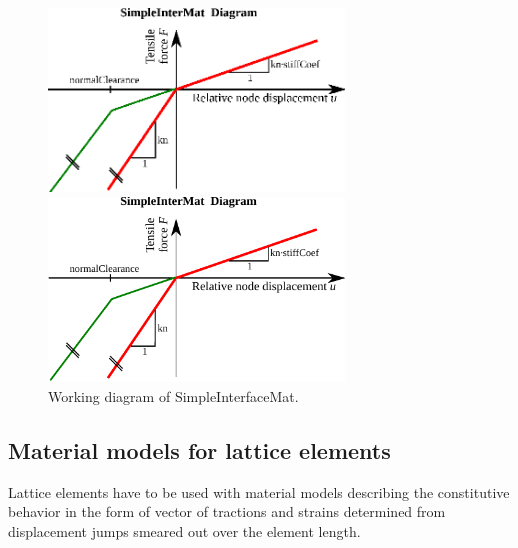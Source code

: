 \documentclass[a4paper]{article}
\begin{document}
\begin{figure}[!htb]
\begin{htmlonly}
  \centerline{\includegraphics[width=0.7\textwidth]{Simple_interface_material_diag.eps}}
\end{htmlonly}
 \centerline{\includegraphics[width=0.7\textwidth]{Simple_interface_material_diag}}
  \caption{Working diagram of SimpleInterfaceMat.}
  \label{SimpleInterfaceMat}
\end{figure}

\subsection{Material models for lattice elements}

Lattice elements have to be used with material models describing the constitutive behavior in the form of vector of  tractions and strains determined from displacement jumps smeared out over the element length.
\end{document}

